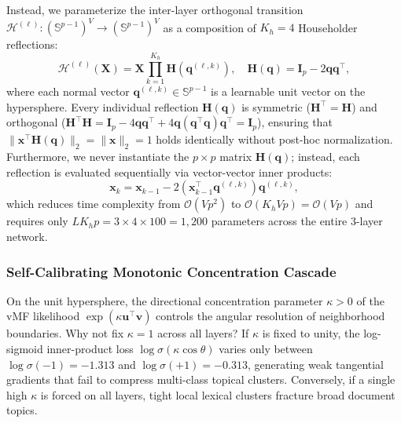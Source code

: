 \documentclass[journal]{IEEEtran}
\begin{document}
Instead, we parameterize the inter-layer orthogonal transition $\mathcal{H}^{(\ell)}: (\mathbb{S}^{p-1})^V \to (\mathbb{S}^{p-1})^V$ as a composition of $K_h = 4$ Householder reflections:
\begin{equation}
\mathcal{H}^{(\ell)}(\mathbf{X}) = \mathbf{X} \prod_{k=1}^{K_h} \mathbf{H}\!\left(\mathbf{q}^{(\ell,k)}\right), \quad \mathbf{H}(\mathbf{q}) = \mathbf{I}_p - 2\mathbf{q}\mathbf{q}^\top,
\label{eq:householder}
\end{equation}
where each normal vector $\mathbf{q}^{(\ell,k)} \in \mathbb{S}^{p-1}$ is a learnable unit vector on the hypersphere. Every individual reflection $\mathbf{H}(\mathbf{q})$ is symmetric ($\mathbf{H}^\top = \mathbf{H}$) and orthogonal ($\mathbf{H}^\top \mathbf{H} = \mathbf{I}_p - 4\mathbf{q}\mathbf{q}^\top + 4\mathbf{q}(\mathbf{q}^\top\mathbf{q})\mathbf{q}^\top = \mathbf{I}_p$), ensuring that $\|\mathbf{x}^\top \mathbf{H}(\mathbf{q})\|_2 = \|\mathbf{x}\|_2 = 1$ holds identically without post-hoc normalization. Furthermore, we never instantiate the $p \times p$ matrix $\mathbf{H}(\mathbf{q})$; instead, each reflection is evaluated sequentially via vector-vector inner products:
\begin{equation}
\mathbf{x}_{k} = \mathbf{x}_{k-1} - 2\left(\mathbf{x}_{k-1}^\top \mathbf{q}^{(\ell,k)}\right)\mathbf{q}^{(\ell,k)},
\label{eq:householder_fast}
\end{equation}
which reduces time complexity from $\mathcal{O}(Vp^2)$ to $\mathcal{O}(K_h V p) = \mathcal{O}(Vp)$ and requires only $L K_h p = 3 \times 4 \times 100 = 1,200$ parameters across the entire 3-layer network.

\subsubsection{Self-Calibrating Monotonic Concentration Cascade}
On the unit hypersphere, the directional concentration parameter $\kappa > 0$ of the vMF likelihood $\exp(\kappa \mathbf{u}^\top \mathbf{v})$ controls the angular resolution of neighborhood boundaries. Why not fix $\kappa = 1$ across all layers? If $\kappa$ is fixed to unity, the log-sigmoid inner-product loss $\log \sigma(\kappa \cos\theta)$ varies only between $\log\sigma(-1) = -1.313$ and $\log\sigma(+1) = -0.313$, generating weak tangential gradients that fail to compress multi-class topical clusters. Conversely, if a single high $\kappa$ is forced on all layers, tight local lexical clusters fracture broad document topics.
\end{document}
